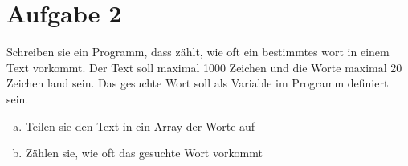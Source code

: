 \documentclass{standalone}
\begin{document}
\section{Aufgabe 2}
    Schreiben sie ein Programm, dass zählt, wie oft ein bestimmtes wort in einem Text vorkommt. Der Text soll maximal 1000 Zeichen und die Worte maximal 20 Zeichen land sein. Das gesuchte Wort soll als Variable im Programm definiert sein.

\begin{enumerate}[a)]
\item
    Teilen sie den Text in ein Array der Worte auf

\item
    Zählen sie, wie oft das gesuchte Wort vorkommt

\end{enumerate}
\end{document}

